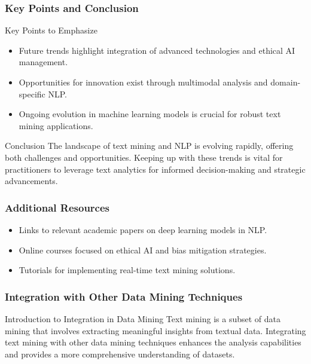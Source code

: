 \documentclass[aspectratio=169]{beamer}
\begin{document}
\begin{frame}[fragile]
  \frametitle{Key Points and Conclusion}
  \begin{block}{Key Points to Emphasize}
    \begin{itemize}
      \item Future trends highlight integration of advanced technologies and ethical AI management.
      \item Opportunities for innovation exist through multimodal analysis and domain-specific NLP.
      \item Ongoing evolution in machine learning models is crucial for robust text mining applications.
    \end{itemize}
  \end{block}

  \begin{block}{Conclusion}
    The landscape of text mining and NLP is evolving rapidly, offering both challenges and opportunities. Keeping up with these trends is vital for practitioners to leverage text analytics for informed decision-making and strategic advancements.
  \end{block}
\end{frame}

\begin{frame}[fragile]
  \frametitle{Additional Resources}
  \begin{itemize}
    \item Links to relevant academic papers on deep learning models in NLP.
    \item Online courses focused on ethical AI and bias mitigation strategies.
    \item Tutorials for implementing real-time text mining solutions.
  \end{itemize}
\end{frame}

\begin{frame}[fragile]
    \frametitle{Integration with Other Data Mining Techniques}
    \begin{block}{Introduction to Integration in Data Mining}
        Text mining is a subset of data mining that involves extracting meaningful insights from textual data. Integrating text mining with other data mining techniques enhances the analysis capabilities and provides a more comprehensive understanding of datasets.
    \end{block}
\end{frame}
\end{document}
